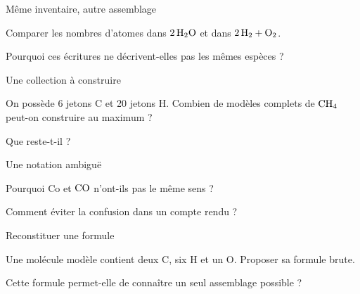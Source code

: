 \clearpage{}
\par\noindent\begin{minipage}{\linewidth}
\begin{exercice}[3]{Même inventaire, autre assemblage}
\begin{questions}
\item Comparer les nombres d’atomes dans $2\,\ce{H2O}$ et dans $2\,\ce{H2}+\ce{O2}$.
\item Pourquoi ces écritures ne décrivent-elles pas les mêmes espèces ?
\end{questions}
\end{exercice}
\end{minipage}
\par\noindent\begin{minipage}{\linewidth}
\begin{exercice}[3]{Une collection à construire}
\begin{questions}
\item On possède 6 jetons C et 20 jetons H. Combien de modèles complets de $\ce{CH4}$ peut-on construire au maximum ?
\item Que reste-t-il ?
\end{questions}
\end{exercice}
\end{minipage}
\par\noindent\begin{minipage}{\linewidth}
\begin{exercice}[3]{Une notation ambiguë}
\begin{questions}
\item Pourquoi Co et $\ce{CO}$ n’ont-ils pas le même sens ?
\item Comment éviter la confusion dans un compte rendu ?
\end{questions}
\end{exercice}
\end{minipage}
\par\noindent\begin{minipage}{\linewidth}
\begin{exercice}[3]{Reconstituer une formule}
\begin{questions}
\item Une molécule modèle contient deux C, six H et un O. Proposer sa formule brute.
\item Cette formule permet-elle de connaître un seul assemblage possible ?
\end{questions}
\end{exercice}
\end{minipage}
